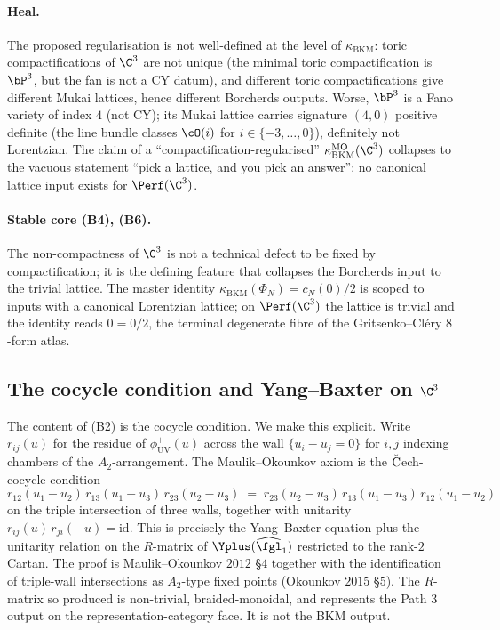 \paragraph{Heal.} The proposed regularisation is not well-defined
at the level of $\kappa_{\mathrm{BKM}}$: toric compactifications of
$\C^3$ are not unique (the minimal toric compactification is
$\bP^3$, but the fan is not a CY datum), and different toric
compactifications give different Mukai lattices, hence different
Borcherds outputs. Worse, $\bP^3$ is a Fano variety of index $4$
(not CY); its Mukai lattice carries signature $(4, 0)$ positive
definite (the line bundle classes $\cO(i)$ for $i \in
\{-3, \ldots, 0\}$), definitely not Lorentzian. The claim of a
``compactification-regularised'' $\kappa_{\mathrm{BKM}}^{\mathrm{MO}}
(\C^3)$ collapses to the vacuous statement ``pick a lattice,
and you pick an answer''; no canonical lattice input exists for
$\Perf(\C^3)$.

\paragraph{Stable core (B4), (B6).} The non-compactness of
$\C^3$ is not a technical defect to be fixed by compactification;
it is the defining feature that collapses the Borcherds input to
the trivial lattice. The master identity
$\kappa_{\mathrm{BKM}}(\Phi_N) = c_N(0)/2$ is scoped to inputs
with a canonical Lorentzian lattice; on $\Perf(\C^3)$ the lattice
is trivial and the identity reads $0 = 0/2$, the terminal
degenerate fibre of the Gritsenko--Cl\'ery $8$-form atlas.

\subsection*{The cocycle condition and Yang--Baxter on $\C^3$}

The content of (B2) is the cocycle condition. We make this explicit.
Write $r_{ij}(u)$ for the residue of $\phi^+_{\mathrm{UV}}(u)$ across
the wall $\{u_i - u_j = 0\}$ for $i, j$ indexing chambers of the
$A_2$-arrangement. The Maulik--Okounkov axiom is the $\check{\text
C}$ech-cocycle condition
\[
 r_{12}(u_1 - u_2) \, r_{13}(u_1 - u_3) \, r_{23}(u_2 - u_3)
 \;=\; r_{23}(u_2 - u_3) \, r_{13}(u_1 - u_3) \, r_{12}(u_1 - u_2)
\]
on the triple intersection of three walls, together with unitarity
$r_{ij}(u) \, r_{ji}(-u) = \mathrm{id}$. This is precisely the
Yang--Baxter equation plus the unitarity relation on the $R$-matrix
of $\Yplus(\widehat{\fgl}_1)$ restricted to the rank-$2$ Cartan.
The proof is Maulik--Okounkov $2012$ \S $4$ together with the
identification of triple-wall intersections as $A_2$-type fixed
points (Okounkov $2015$ \S $5$). The $R$-matrix so produced is
non-trivial, braided-monoidal, and represents the Path 3 output
on the representation-category face. It is not the BKM output.

